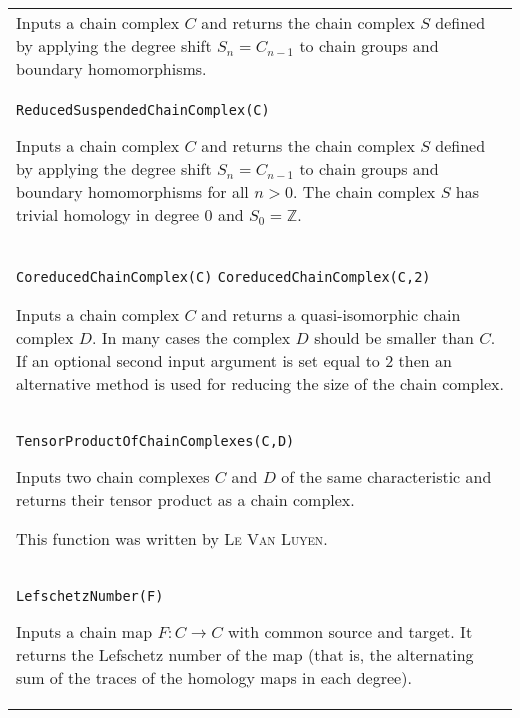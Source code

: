 \documentclass[a4paper,11pt]{report}
\begin{document}
{\begin{center}
\begin{tabular}{|l|}
 Inputs a chain complex $C$ and returns the chain complex $S$ defined by applying the degree shift $S_n = C_{n-1}$ to chain groups and boundary homomorphisms. \\
 \index{ReducedSuspendedChainComplex} \texttt{ReducedSuspendedChainComplex(C)} 

 Inputs a chain complex $C$ and returns the chain complex $S$ defined by applying the degree shift $S_n = C_{n-1}$ to chain groups and boundary homomorphisms for all $n > 0$. The chain complex $S$ has trivial homology in degree $0$ and $S_0=\mathbb Z$. \\
 \index{CoreducedChainComplex} \texttt{CoreducedChainComplex(C)} \texttt{CoreducedChainComplex(C,2)} 

 Inputs a chain complex $C$ and returns a quasi-isomorphic chain complex $D$. In many cases the complex $D$ should be smaller than $C$. If an optional second input argument is set equal to 2 then an alternative
method is used for reducing the size of the chain complex. \\
 \index{TensorProductOfChainComplexes} \texttt{TensorProductOfChainComplexes(C,D)} 

 Inputs two chain complexes $C$ and $D$ of the same characteristic and returns their tensor product as a chain
complex. 

 This function was written by \textsc{ Le Van Luyen}. \\
 \index{LefschetzNumber} \texttt{LefschetzNumber(F)} 

 Inputs a chain map $F\colon C\rightarrow C$ with common source and target. It returns the Lefschetz number of the map
(that is, the alternating sum of the traces of the homology maps in each
degree). \\
\end{tabular}\\[2mm]
\end{center}

 }

 
\end{document}
